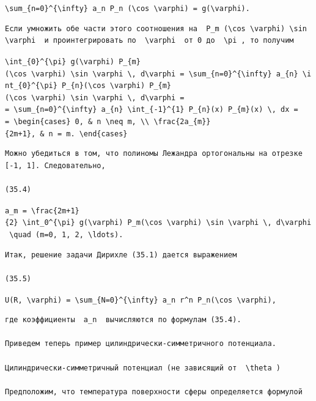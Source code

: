 \documentclass[
  ukrainian,
]{article}
\begin{document}
\texttt{\textbackslash{}sum\_\{n=0\}\^{}\{\textbackslash{}infty\}\ a\_n\ P\_n\ (\textbackslash{}cos\ \textbackslash{}varphi)\ =\ g(\textbackslash{}varphi).}

\begin{verbatim}
Если умножить обе части этого соотношения на  P_m (\cos \varphi) \sin \varphi  и проинтегрировать по  \varphi  от 0 до  \pi , то получим
\end{verbatim}

\texttt{\textbackslash{}int\_\{0\}\^{}\{\textbackslash{}pi\}\ g(\textbackslash{}varphi)\ P\_\{m\}(\textbackslash{}cos\ \textbackslash{}varphi)\ \textbackslash{}sin\ \textbackslash{}varphi\ \textbackslash{},\ d\textbackslash{}varphi\ =\ \textbackslash{}sum\_\{n=0\}\^{}\{\textbackslash{}infty\}\ a\_\{n\}\ \textbackslash{}int\_\{0\}\^{}\{\textbackslash{}pi\}\ P\_\{n\}(\textbackslash{}cos\ \textbackslash{}varphi)\ P\_\{m\}(\textbackslash{}cos\ \textbackslash{}varphi)\ \textbackslash{}sin\ \textbackslash{}varphi\ \textbackslash{},\ d\textbackslash{}varphi\ =}
\texttt{=\ \textbackslash{}sum\_\{n=0\}\^{}\{\textbackslash{}infty\}\ a\_\{n\}\ \textbackslash{}int\_\{-1\}\^{}\{1\}\ P\_\{n\}(x)\ P\_\{m\}(x)\ \textbackslash{},\ dx\ =}
\texttt{=\ \textbackslash{}begin\{cases\}\ 0,\ \&\ n\ \textbackslash{}neq\ m,\ \textbackslash{}\textbackslash{}\ \textbackslash{}frac\{2a\_\{m\}\}\{2m+1\},\ \&\ n\ =\ m.\ \textbackslash{}end\{cases\}}

\begin{verbatim}
Можно убедиться в том, что полиномы Лежандра ортогональны на отрезке [-1, 1]. Следовательно,

(35.4)
\end{verbatim}

\texttt{a\_m\ =\ \textbackslash{}frac\{2m+1\}\{2\}\ \textbackslash{}int\_0\^{}\{\textbackslash{}pi\}\ g(\textbackslash{}varphi)\ P\_m(\textbackslash{}cos\ \textbackslash{}varphi)\ \textbackslash{}sin\ \textbackslash{}varphi\ \textbackslash{},\ d\textbackslash{}varphi\ \textbackslash{}quad\ (m=0,\ 1,\ 2,\ \textbackslash{}ldots).}

\begin{verbatim}
Итак, решение задачи Дирихле (35.1) дается выражением

(35.5)
\end{verbatim}

\texttt{U(R,\ \textbackslash{}varphi)\ =\ \textbackslash{}sum\_\{N=0\}\^{}\{\textbackslash{}infty\}\ a\_n\ r\^{}n\ P\_n(\textbackslash{}cos\ \textbackslash{}varphi),}

\begin{verbatim}
где коэффициенты  a_n  вычисляются по формулам (35.4).

Приведем теперь пример цилиндрически-симметричного потенциала.

Цилиндрически-симметричный потенциал (не зависящий от  \theta )

Предположим, что температура поверхности сферы определяется формулой
\end{verbatim}
\end{document}
